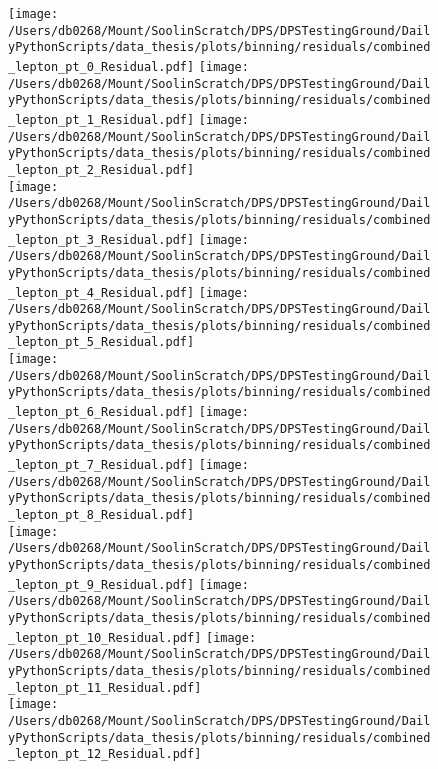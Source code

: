 \begin{figure}[htpb]
	\centering
	\texttt{[image: /Users/db0268/Mount/SoolinScratch/DPS/DPSTestingGround/DailyPythonScripts/data\_thesis/plots/binning/residuals/combined\_lepton\_pt\_0\_Residual.pdf]}
	\texttt{[image: /Users/db0268/Mount/SoolinScratch/DPS/DPSTestingGround/DailyPythonScripts/data\_thesis/plots/binning/residuals/combined\_lepton\_pt\_1\_Residual.pdf]}
	\texttt{[image: /Users/db0268/Mount/SoolinScratch/DPS/DPSTestingGround/DailyPythonScripts/data\_thesis/plots/binning/residuals/combined\_lepton\_pt\_2\_Residual.pdf]} \\
	\texttt{[image: /Users/db0268/Mount/SoolinScratch/DPS/DPSTestingGround/DailyPythonScripts/data\_thesis/plots/binning/residuals/combined\_lepton\_pt\_3\_Residual.pdf]} 
	\texttt{[image: /Users/db0268/Mount/SoolinScratch/DPS/DPSTestingGround/DailyPythonScripts/data\_thesis/plots/binning/residuals/combined\_lepton\_pt\_4\_Residual.pdf]} 
	\texttt{[image: /Users/db0268/Mount/SoolinScratch/DPS/DPSTestingGround/DailyPythonScripts/data\_thesis/plots/binning/residuals/combined\_lepton\_pt\_5\_Residual.pdf]} \\
	\texttt{[image: /Users/db0268/Mount/SoolinScratch/DPS/DPSTestingGround/DailyPythonScripts/data\_thesis/plots/binning/residuals/combined\_lepton\_pt\_6\_Residual.pdf]} 
	\texttt{[image: /Users/db0268/Mount/SoolinScratch/DPS/DPSTestingGround/DailyPythonScripts/data\_thesis/plots/binning/residuals/combined\_lepton\_pt\_7\_Residual.pdf]}
	\texttt{[image: /Users/db0268/Mount/SoolinScratch/DPS/DPSTestingGround/DailyPythonScripts/data\_thesis/plots/binning/residuals/combined\_lepton\_pt\_8\_Residual.pdf]} \\
	\texttt{[image: /Users/db0268/Mount/SoolinScratch/DPS/DPSTestingGround/DailyPythonScripts/data\_thesis/plots/binning/residuals/combined\_lepton\_pt\_9\_Residual.pdf]}
	\texttt{[image: /Users/db0268/Mount/SoolinScratch/DPS/DPSTestingGround/DailyPythonScripts/data\_thesis/plots/binning/residuals/combined\_lepton\_pt\_10\_Residual.pdf]} 
	\texttt{[image: /Users/db0268/Mount/SoolinScratch/DPS/DPSTestingGround/DailyPythonScripts/data\_thesis/plots/binning/residuals/combined\_lepton\_pt\_11\_Residual.pdf]} \\
	\texttt{[image: /Users/db0268/Mount/SoolinScratch/DPS/DPSTestingGround/DailyPythonScripts/data\_thesis/plots/binning/residuals/combined\_lepton\_pt\_12\_Residual.pdf]}

\end{figure}
